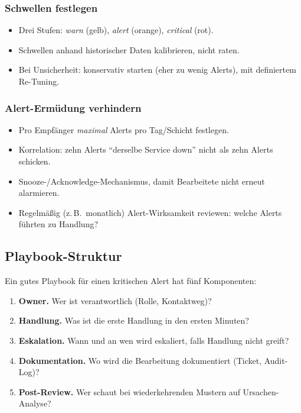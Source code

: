 \documentclass[11pt,a4paper,oneside]{article}
\begin{document}
\subsubsection{Schwellen festlegen}

\begin{itemize}
  \item Drei Stufen: \emph{warn} (gelb), \emph{alert} (orange), \emph{critical} (rot).
  \item Schwellen anhand historischer Daten kalibrieren, nicht raten.
  \item Bei Unsicherheit: konservativ starten (eher zu wenig Alerts), mit definiertem Re-Tuning.
\end{itemize}

\subsubsection{Alert-Ermüdung verhindern}

\begin{itemize}
  \item Pro Empfänger \emph{maximal} Alerts pro Tag/Schicht festlegen.
  \item Korrelation: zehn Alerts ``derselbe Service down'' nicht als zehn Alerts schicken.
  \item Snooze-/Acknowledge-Mechanismus, damit Bearbeitete nicht erneut alarmieren.
  \item Regelmäßig (z.\,B.\ monatlich) Alert-Wirksamkeit reviewen: welche Alerts führten zu Handlung?
\end{itemize}

\subsection{Playbook-Struktur}

Ein gutes Playbook für einen kritischen Alert hat fünf Komponenten:

\begin{enumerate}
  \item \textbf{Owner.} Wer ist verantwortlich (Rolle, Kontaktweg)?
  \item \textbf{Handlung.} Was ist die erste Handlung in den ersten Minuten?
  \item \textbf{Eskalation.} Wann und an wen wird eskaliert, falls Handlung nicht greift?
  \item \textbf{Dokumentation.} Wo wird die Bearbeitung dokumentiert (Ticket, Audit-Log)?
  \item \textbf{Post-Review.} Wer schaut bei wiederkehrenden Mustern auf Ursachen-Analyse?
\end{enumerate}
\end{document}

